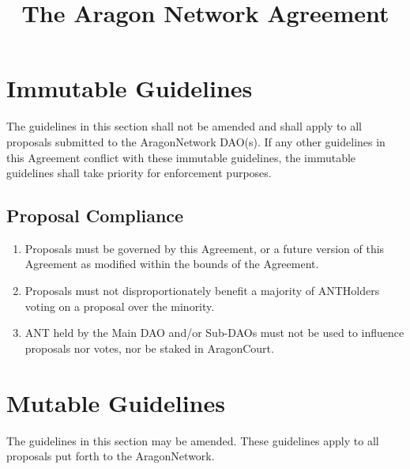 
\title{The Aragon Network Agreement}



\mytitle

\section{Immutable Guidelines}
\label{sec:ImmutableGuidelines}

The guidelines in this section shall not be amended and shall apply to all proposals submitted to the \gls{AragonNetwork} \ac{DAO}(s).
If any other guidelines in this Agreement conflict with these immutable guidelines, the immutable guidelines shall take priority for enforcement purposes.


\subsection{Proposal Compliance}
\begin{enumerate}
	\item Proposals must be governed by this Agreement, or a future version of this Agreement as modified within the bounds of the Agreement.
	\item Proposals must not disproportionately benefit a majority of \glspl{ANTHolder} voting on a proposal over the minority.
	\item \ac{ANT} held by the Main \ac{DAO} and/or Sub-\acp{DAO} must not be used to influence proposals nor votes, nor be staked in \gls{AragonCourt}.
\end{enumerate}


\section{Mutable Guidelines}
\label{sec:MutableGuidelines}

The guidelines in this section may be amended.
These guidelines apply to all proposals put forth to the \gls{AragonNetwork}.

	
